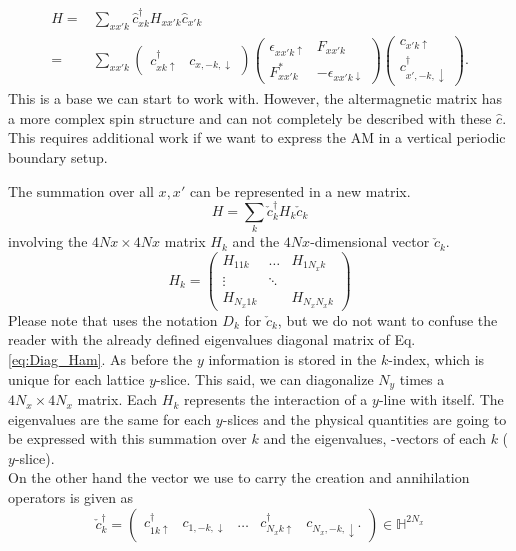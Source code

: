 \documentclass[../main.tex]{subfile}
\begin{document}
\begin{equation}
    \begin{aligned}
    H =& \sum_{xx'k} \hat{c}_{xk}^{\dagger} H_{xx'k} \hat{c}_{x'k}\\
      =& \sum_{xx'k} \begin{pmatrix}
        c^{\dagger}_{xk\uparrow} & c_{x,-k,\downarrow}
      \end{pmatrix}
        \begin{pmatrix}
            \epsilon_{xx'k\uparrow} & F_{xx'k}\\
            F_{xx'k}^{\ast} & -\epsilon_{xx'k\downarrow}
        \end{pmatrix}
        \begin{pmatrix}
            c_{x'k\uparrow}\\
            c^{\dagger}_{x',-k,\downarrow}
        \end{pmatrix}.
    \end{aligned}
\end{equation}
This is a base we can start to work with. However, the altermagnetic matrix has a more complex spin structure and can not completely be described with these $\hat{c}$.
This requires additional work if we want to express the AM in a vertical periodic boundary setup.

The summation over all $x,x'$ can be represented in a new matrix.
\[
    H = \sum_k \check{c}_k^{\dagger} H_k \check{c}_k
\]
involving the $4Nx \times 4Nx$ matrix $H_k$ and the $4Nx$-dimensional vector $\check{c}_k$. 
\[
    H_k = \begin{pmatrix}
        H_{11k} &\dots & H_{1N_xk}\\
        \vdots&\ddots&\\
        H_{N_x1k} & & H_{N_xN_xk}
    \end{pmatrix}
\]
Please note that \cite{Mjos2019} uses the notation $D_k$ for $\check{c}_k$, but we do not want to confuse the reader with the already defined eigenvalues
 diagonal matrix of Eq. \ref{eq:Diag_Ham}.
As before the $y$ information is stored in the $k$-index, which is unique for each lattice $y$-slice. This said, we 
can diagonalize $N_y$ times a $4N_x \times 4N_x$ matrix. Each $H_k$ represents the interaction of a $y$-line with itself.
The eigenvalues are the same for each $y$-slices and the physical
quantities are going to be expressed with this summation over $k$ and the eigenvalues, -vectors of each $k$ ($y$-slice).\\

On the other hand the vector we use to carry the creation and annihilation operators is given as 
\[
    \check{c}_k^{\dagger} = \begin{pmatrix}
        c^{\dagger}_{1k\uparrow} & c_{1,-k,\downarrow}& \dots &c^{\dagger}_{N_x k\uparrow} & c_{N_x,-k,\downarrow}.
    \end{pmatrix}\in\mathbb{H}^{2N_x}
\]
\end{document}
